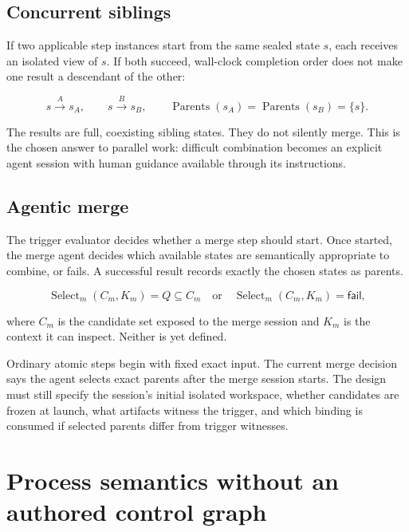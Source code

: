 \documentclass[11pt]{article}
\begin{document}
\subsection{Concurrent siblings}

If two applicable step instances start from the same sealed state \(s\), each receives an isolated view of \(s\). If both succeed, wall-clock completion order does not make one result a descendant of the other:

\begin{equation}
  s\xrightarrow{A}s_A,\qquad s\xrightarrow{B}s_B,\qquad
  \operatorname{Parents}(s_A)=\operatorname{Parents}(s_B)=\{s\}.
\end{equation}

The results are full, coexisting sibling states. They do not silently merge. This is the chosen answer to parallel work: difficult combination becomes an explicit agent session with human guidance available through its instructions.

\subsection{Agentic merge}

The trigger evaluator decides whether a merge step should start. Once started, the merge agent decides which available states are semantically appropriate to combine, or fails. A successful result records exactly the chosen states as parents.

\begin{equation}
  \operatorname{Select}_m(C_m,K_m)=Q\subseteq C_m
  \quad\text{or}\quad
  \operatorname{Select}_m(C_m,K_m)=\mathsf{fail},
\end{equation}

where \(C_m\) is the candidate set exposed to the merge session and \(K_m\) is the context it can inspect. Neither is yet defined.

\begin{warningbox}
Ordinary atomic steps begin with fixed exact input. The current merge decision says the agent selects exact parents after the merge session starts. The design must still specify the session's initial isolated workspace, whether candidates are frozen at launch, what artifacts witness the trigger, and which binding is consumed if selected parents differ from trigger witnesses.
\end{warningbox}

\section{Process semantics without an authored control graph}
\end{document}
